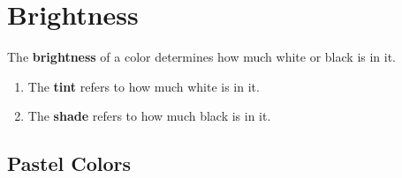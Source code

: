 \section{Brightness}

  \begin{definition}[Brightness]
    The \textbf{brightness} of a color determines how much white or black is in it. 
    \begin{enumerate}
      \item The \textbf{tint} refers to how much white is in it. 
      \item The \textbf{shade} refers to how much black is in it. 
    \end{enumerate}
  \end{definition}

\subsection{Pastel Colors}
